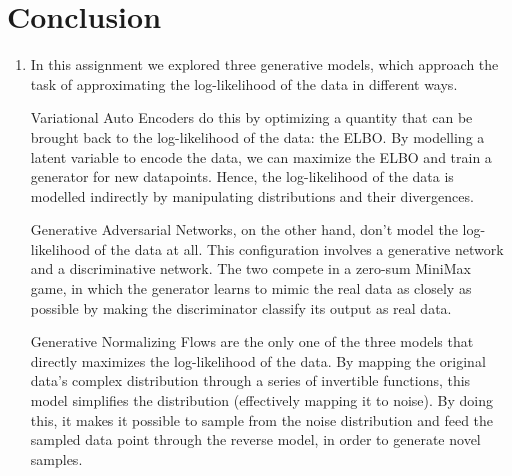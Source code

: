 \documentclass{article}
\begin{document}
\section{Conclusion}

\begin{enumerate}[label=\textbf{4.\arabic*}]
  \item
  In this assignment we explored three generative models, which approach the task of approximating the log-likelihood of the data in different ways.

  Variational Auto Encoders do this by optimizing a quantity that can be brought back to the log-likelihood of the data: the ELBO. By modelling a latent variable to encode the data, we can maximize the ELBO and train a generator for new datapoints. Hence, the log-likelihood of the data is modelled indirectly by manipulating distributions and their divergences.

  Generative Adversarial Networks, on the other hand, don't model the log-likelihood of the data at all. This configuration involves a generative network and a discriminative network. The two compete in a zero-sum MiniMax game, in which the generator learns to mimic the real data as closely as possible by making the discriminator classify its output as real data.

  Generative Normalizing Flows are the only one of the three models that directly maximizes the log-likelihood of the data. By mapping the original data's complex distribution through a series of invertible functions, this model simplifies the distribution (effectively mapping it to noise). By doing this, it makes it possible to sample from the noise distribution and feed the sampled data point through the reverse model, in order to generate novel samples.
\end{enumerate}
\end{document}
